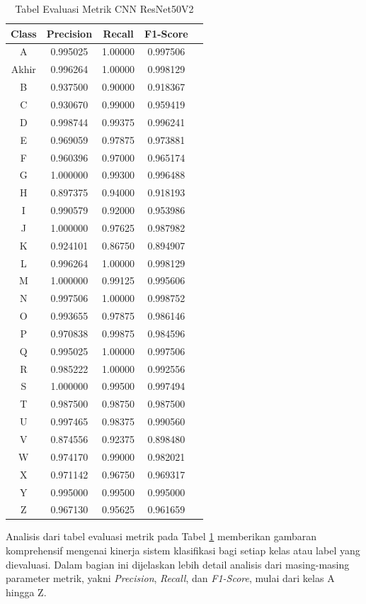 \begin{table}[h]
\centering
\caption{Tabel Evaluasi Metrik CNN ResNet50V2}
\begin{tabular}{|c|c|c|c|c|}
\hline
Class & Precision & Recall & F1-Score \\
\hline
A & 0.995025 & 1.00000 & 0.997506 \\
Akhir & 0.996264 & 1.00000 & 0.998129 \\
B & 0.937500 & 0.90000 & 0.918367 \\
C & 0.930670 & 0.99000 & 0.959419 \\
D & 0.998744 & 0.99375 & 0.996241 \\
E & 0.969059 & 0.97875 & 0.973881 \\
F & 0.960396 & 0.97000 & 0.965174 \\
G & 1.000000 & 0.99300 & 0.996488 \\
H & 0.897375 & 0.94000 & 0.918193 \\
I & 0.990579 & 0.92000 & 0.953986 \\
J & 1.000000 & 0.97625 & 0.987982 \\
K & 0.924101 & 0.86750 & 0.894907 \\
L & 0.996264 & 1.00000 & 0.998129 \\
M & 1.000000 & 0.99125 & 0.995606 \\
N & 0.997506 & 1.00000 & 0.998752 \\
O & 0.993655 & 0.97875 & 0.986146 \\
P & 0.970838 & 0.99875 & 0.984596 \\
Q & 0.995025 & 1.00000 & 0.997506 \\
R & 0.985222 & 1.00000 & 0.992556 \\
S & 1.000000 & 0.99500 & 0.997494 \\
T & 0.987500 & 0.98750 & 0.987500 \\
U & 0.997465 & 0.98375 & 0.990560 \\
V & 0.874556 & 0.92375 & 0.898480 \\
W & 0.974170 & 0.99000 & 0.982021 \\
X & 0.971142 & 0.96750 & 0.969317 \\
Y & 0.995000 & 0.99500 & 0.995000 \\
Z & 0.967130 & 0.95625 & 0.961659 \\
\hline
\end{tabular}
\label{tab:tabelevaluasicnnresnet50v2}
\end{table}

Analisis dari tabel evaluasi metrik pada Tabel \ref{tab:tabelevaluasicnnresnet50v2} memberikan gambaran komprehensif mengenai kinerja sistem klasifikasi bagi setiap kelas atau label yang dievaluasi. Dalam bagian ini dijelaskan lebih detail analisis dari masing-masing parameter metrik, yakni \textit{Precision}, \textit{Recall}, dan \textit{F1-Score}, mulai dari kelas A hingga Z.

